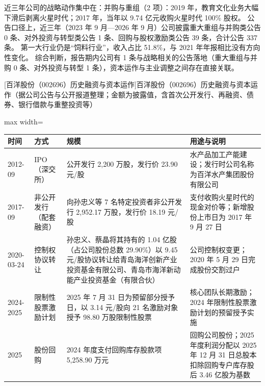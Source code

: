  近三年公司的战略动作集中在：并购与重组（2 项）：2019 年，教育文化业务大幅下滑后剥离火星时代；2017 年，当年以 9.74 亿元收购火星时代 100\% 股权。 公告口径上，近三年（2023 年 9 月---2026 年 9 月）公司披露重大重组与并购类公告 0 条、对外投资与转型类公告 1 条、回购与股权激励类公告 39 条，合计公告 337 条。 第一大行业仍是“饲料行业”，收入占比 51.8\%，与 2021 年年报相比没有方向性变化。 综合判断，报告期内公司有 1 条与战略相关的公告落地（重大重组与并购 0 条、对外投资与转型 1 条），资本运作与主业调整之间存在直接关联。

\begin{center}\small\setlength{\tabcolsep}{4pt}
[百洋股份（002696）历史融资与资本运作]{百洋股份（002696）历史融资与资本运作（据公司公告与公开报道整理；金额为披露值，含首次公开发行、再融资、债券、银行借款与重整投资等）}
\begin{adjustbox}{max width=\textwidth}
\begin{tabular}{@{}p{1.45cm}p{2.55cm}p{4.05cm}p{4.95cm}@{}}
\toprule
时间 & 方式 & 规模 & 用途与说明 \\
\midrule
2012-09 & IPO（深交所） & 公开发行 2,\allowbreak{}200 万股，\allowbreak{}发行价 23.90 元/\allowbreak{}股 & 水产品加工产能建设；发行时公司名称为百洋水产集团股份有限公司 \\
2017-09 & 非公开发行（配套融资） & 向孙忠义等 7 名特定投资者非公开发行 2,\allowbreak{}952.17 万股，\allowbreak{}发行价 18.19 元/\allowbreak{}股 & 支付收购火星时代的现金对价等；新增股份上市日为 2017 年 9 月 27 日 \\
2020-03-24 & 控制权协议转让 & 孙忠义、\allowbreak{}蔡晶将其持有的 1.04 亿股（占公司股份总数 29.90\%）以 9.45 元/\allowbreak{}股协议转让给青岛海洋创新产业投资基金有限公司、\allowbreak{}青岛市海洋新动能产业投资基金（有限合伙） & 公司控制权变更；2020 年 5 月 29 日完成股份交割过户 \\
2024-2025 & 限制性股票激励计划 & 2025 年 7 月 31 日为预留部分授予日，\allowbreak{}以 3.14 元/\allowbreak{}股向 21 名激励对象授予 98.80 万股限制性股票 & 核心团队长期激励；2024 年限制性股票激励计划的预留授予实施 \\
2025 & 股份回购 & 2024 年度支付回购库存股款项 5,\allowbreak{}258.90 万元 & 回购公司股份；2025 年度利润分配以 2025 年 12 月 31 日总股本扣除回购专户库存股后 3.46 亿股为基数 \\
\bottomrule
\end{tabular}
\end{adjustbox}
\end{center}


